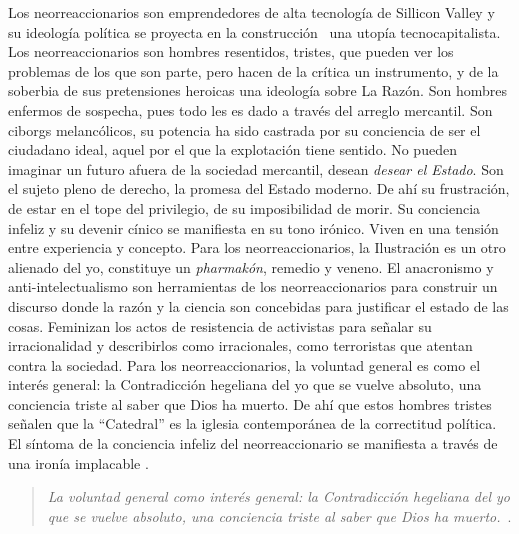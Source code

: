 Los neorreaccionarios son emprendedores de alta tecnología de Sillicon Valley y su ideología política se proyecta en la construcción~ una utopía tecnocapitalista. Los neorreaccionarios son hombres resentidos, tristes, que pueden ver los problemas de los que son parte, pero hacen de la crítica un instrumento, y de la soberbia de sus pretensiones heroicas una ideología sobre La Razón. Son hombres enfermos de sospecha, pues todo les es dado a través del arreglo mercantil. Son ciborgs melancólicos, su potencia ha sido castrada por su conciencia de ser el ciudadano ideal, aquel por el que la explotación tiene sentido. No pueden imaginar un futuro afuera de la sociedad mercantil, desean \emph{desear el Estado}. Son el sujeto pleno de derecho, la promesa del Estado moderno. De ahí su frustración, de estar en el tope del privilegio, de su imposibilidad de morir. Su conciencia infeliz y su devenir cínico se manifiesta en su tono irónico. Viven en una tensión entre experiencia y concepto. Para los neorreaccionarios, la Ilustración es un otro alienado del yo, constituye un \emph{pharmakón}, remedio y veneno. El anacronismo y anti-intelectualismo son herramientas de los neorreaccionarios para construir un discurso donde la razón y la ciencia son concebidas para justificar el estado de las cosas. Feminizan los actos de resistencia de activistas para señalar su irracionalidad y describirlos como irracionales, como terroristas que atentan contra la sociedad. Para los neorreaccionarios, la voluntad general es como el interés general: la Contradicción hegeliana del yo que se vuelve absoluto, una conciencia triste al saber que Dios ha muerto. De ahí que estos hombres tristes señalen que la \enquote{Catedral} es la iglesia contemporánea de la correctitud política. El síntoma de la conciencia infeliz del neorreaccionario se manifiesta a través de una ironía implacable \autocite{huiUnhappyConsciousnessNeoreactionaries2017}.

\begin{quote}
  \emph{La voluntad general como interés general: la Contradicción hegeliana del yo que se vuelve absoluto, una conciencia triste al saber que Dios ha muerto.}~\autocite{huiUnhappyConsciousnessNeoreactionaries2017}.
\end{quote}

